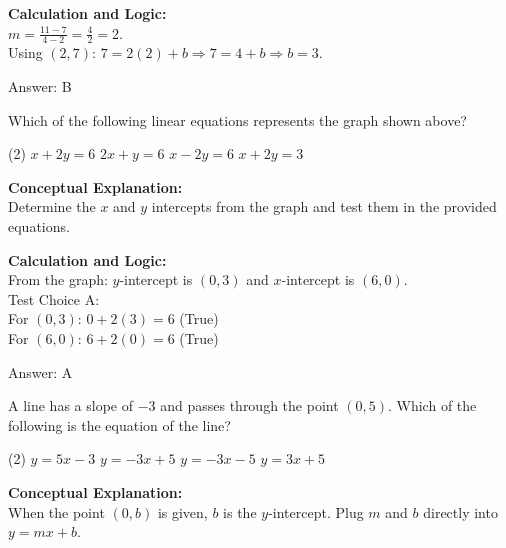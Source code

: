 \documentclass[11pt,paper=a4,answers]{exam}
\begin{document}
\begin{questions}
\begin{solution}
\vspace{10pt}
\textbf{Calculation and Logic:} \\
$m = \frac{11 - 7}{4 - 2} = \frac{4}{2} = 2$. \\
Using $(2, 7)$: $7 = 2(2) + b \Rightarrow 7 = 4 + b \Rightarrow b = 3$.

\vspace{15pt}
Answer: \colorbox{yellow!100}{B}
\end{solution}

\vspace{20pt}

\question

Which of the following linear equations represents the graph shown above?
\begin{tasks}(2)
    \task $x + 2y = 6$
    \task $2x + y = 6$
    \task $x - 2y = 6$
    \task $x + 2y = 3$
\end{tasks}

\begin{solution}
\textbf{Conceptual Explanation:} \\
Determine the $x$ and $y$ intercepts from the graph and test them in the provided equations.

\vspace{10pt}
\textbf{Calculation and Logic:} \\
From the graph: $y$-intercept is $(0, 3)$ and $x$-intercept is $(6, 0)$. \\
Test Choice A: \\
For $(0, 3)$: $0 + 2(3) = 6$ (True) \\
For $(6, 0)$: $6 + 2(0) = 6$ (True)

\vspace{15pt}
Answer: \colorbox{yellow!100}{A}
\end{solution}

\vspace{20pt}

\question
A line has a slope of $-3$ and passes through the point $(0, 5)$. Which of the following is the equation of the line?
\begin{tasks}(2)
    \task $y = 5x - 3$
    \task $y = -3x + 5$
    \task $y = -3x - 5$
    \task $y = 3x + 5$
\end{tasks}

\begin{solution}
\textbf{Conceptual Explanation:} \\
When the point $(0, b)$ is given, $b$ is the $y$-intercept. Plug $m$ and $b$ directly into $y = mx + b$.


\end{solution}
\end{questions}
\end{document}
